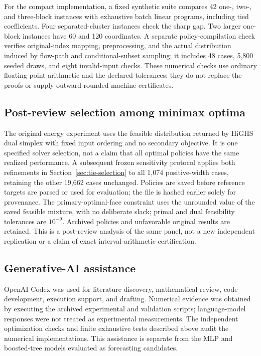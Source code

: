 \documentclass[12pt]{article}
\begin{document}
For the compact implementation, a fixed synthetic suite compares 42
one-, two-, and three-block instances with exhaustive batch linear programs,
including tied coefficients. Four separated-cluster instances check the
sharp gap. Two larger one-block instances have 60 and 120 coordinates.
A separate policy-compilation check verifies original-index mapping,
preprocessing, and the actual distribution induced by flow-path and
conditional-subset sampling; it includes 48 cases, 5,800 seeded draws,
and eight invalid-input checks. These numerical checks use ordinary
floating-point arithmetic and the declared tolerances; they do not replace
the proofs or supply outward-rounded machine certificates.


\subsection{Post-review selection among minimax optima}\label{sec:tie-design}
The original energy experiment uses the feasible distribution returned by
HiGHS dual simplex with fixed input ordering and no secondary objective.
It is one specified solver selection, not a claim that all optimal policies
have the same realized performance. A subsequent frozen sensitivity protocol
applies both refinements in Section~\ref{sec:tie-selection} to all 1,074
positive-width cases, retaining the other 19,662 cases unchanged. Policies
are saved before reference targets are parsed or used for evaluation;
the file is hashed earlier solely for provenance. The
primary-optimal-face constraint uses the unrounded value of the saved
feasible mixture, with no deliberate slack; primal and dual feasibility
tolerances are $10^{-9}$. Archived policies and unfavorable original results
are retained. This is a post-review analysis of the same panel, not a new
independent replication or a claim of exact interval-arithmetic certification.

\subsection{Generative-AI assistance}
OpenAI Codex was used for literature discovery, mathematical review,
code development, execution support, and drafting. Numerical evidence was
obtained by executing the archived experimental and validation scripts;
language-model responses were not treated as experimental measurements.
The independent optimization checks and finite exhaustive tests described
above audit the numerical implementations. This assistance is separate
from the MLP and boosted-tree models evaluated as forecasting candidates.
\end{document}
